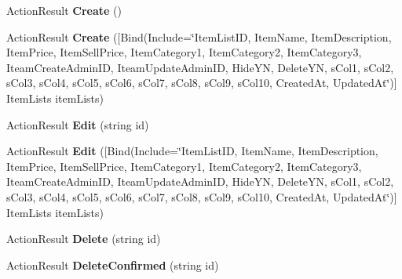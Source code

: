 \begin{DoxyCompactItemize}
\item 
Action\+Result {\bfseries Create} ()\hypertarget{class_cloud_bread_admin_web_1_1_controllers_1_1_____item_lists_controller_a10ee2bbef36674323c62a89ca16ef224}{}\label{class_cloud_bread_admin_web_1_1_controllers_1_1_____item_lists_controller_a10ee2bbef36674323c62a89ca16ef224}

\item 
Action\+Result {\bfseries Create} (\mbox{[}Bind(Include=\char`\"{}Item\+List\+ID, Item\+Name, Item\+Description, Item\+Price, Item\+Sell\+Price, Item\+Category1, Item\+Category2, Item\+Category3, Iteam\+Create\+Admin\+ID, Iteam\+Update\+Admin\+ID, Hide\+YN, Delete\+YN, s\+Col1, s\+Col2, s\+Col3, s\+Col4, s\+Col5, s\+Col6, s\+Col7, s\+Col8, s\+Col9, s\+Col10, Created\+At, Updated\+At\char`\"{})\mbox{]} Item\+Lists item\+Lists)\hypertarget{class_cloud_bread_admin_web_1_1_controllers_1_1_____item_lists_controller_a6436d4c70a0bcaab1145018b62c025dd}{}\label{class_cloud_bread_admin_web_1_1_controllers_1_1_____item_lists_controller_a6436d4c70a0bcaab1145018b62c025dd}

\item 
Action\+Result {\bfseries Edit} (string id)\hypertarget{class_cloud_bread_admin_web_1_1_controllers_1_1_____item_lists_controller_a43437cac4ef8a4e23727ee68861941d2}{}\label{class_cloud_bread_admin_web_1_1_controllers_1_1_____item_lists_controller_a43437cac4ef8a4e23727ee68861941d2}

\item 
Action\+Result {\bfseries Edit} (\mbox{[}Bind(Include=\char`\"{}Item\+List\+ID, Item\+Name, Item\+Description, Item\+Price, Item\+Sell\+Price, Item\+Category1, Item\+Category2, Item\+Category3, Iteam\+Create\+Admin\+ID, Iteam\+Update\+Admin\+ID, Hide\+YN, Delete\+YN, s\+Col1, s\+Col2, s\+Col3, s\+Col4, s\+Col5, s\+Col6, s\+Col7, s\+Col8, s\+Col9, s\+Col10, Created\+At, Updated\+At\char`\"{})\mbox{]} Item\+Lists item\+Lists)\hypertarget{class_cloud_bread_admin_web_1_1_controllers_1_1_____item_lists_controller_a20b5c0d6b9166864257fb5f3b4e922d0}{}\label{class_cloud_bread_admin_web_1_1_controllers_1_1_____item_lists_controller_a20b5c0d6b9166864257fb5f3b4e922d0}

\item 
Action\+Result {\bfseries Delete} (string id)\hypertarget{class_cloud_bread_admin_web_1_1_controllers_1_1_____item_lists_controller_af41216167b50e9a12a558729ee146437}{}\label{class_cloud_bread_admin_web_1_1_controllers_1_1_____item_lists_controller_af41216167b50e9a12a558729ee146437}

\item 
Action\+Result {\bfseries Delete\+Confirmed} (string id)\hypertarget{class_cloud_bread_admin_web_1_1_controllers_1_1_____item_lists_controller_ab75187ceb86a806c6faa82a8a4b0d0a9}{}\label{class_cloud_bread_admin_web_1_1_controllers_1_1_____item_lists_controller_ab75187ceb86a806c6faa82a8a4b0d0a9}

\end{DoxyCompactItemize}
